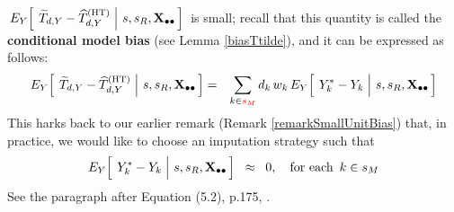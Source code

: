 \begin{itemize}
    \,$
    E_{Y}\!\left[\;
        \left.
        \widetilde{T}_{d,Y} \overset{{\color{white}.}}{-} \widehat{T}^{\textnormal{(HT)}}_{d,Y}
        \;\right\vert\,
        s,s_{R},\Xobs
        \,\right]
    $\,
    is small;
    recall that this quantity is called the \textbf{conditional model bias}
    (see Lemma \ref{biasTtilde}), and
    it can be expressed as follows:
    \begin{eqnarray*}
    E_{Y}\!\left[\;
        \left.
        \widetilde{T}_{d,Y} \overset{{\color{white}.}}{-} \widehat{T}^{\textnormal{(HT)}}_{d,Y}
        \;\right\vert\,
        s,s_{R},\Xobs
        \,\right]
    & = &
        \underset{k\in{\color{red}s_{M}}}{\sum}\,d_{k}\,w_{k}\,
        E_{Y}\!\left[\;
            \left.
            Y^{*}_{k} \overset{{\color{white}.}}{-} Y_{k}
            \;\right\vert\,
            s,s_{R},\Xobs
            \,\right]
    \end{eqnarray*}
    This harks back to our earlier remark (Remark \ref{remarkSmallUnitBias}) that,
    in practice, we would like to choose an imputation strategy such that
    \begin{equation*}
    E_{Y}\!\left[\;
        \left.
        Y^{*}_{k} \overset{{\color{white}.}}{-} Y_{k}
        \;\right\vert\,
        s,s_{R},\Xobs
        \,\right]
    \;\; \approx \;\;
        0,
    \quad
    \textnormal{for each \,$k \in s_{M}$}
    \end{equation*}
    See the paragraph after Equation (5.2), p.175, \cite{Beaumont2011}.
\end{itemize}

